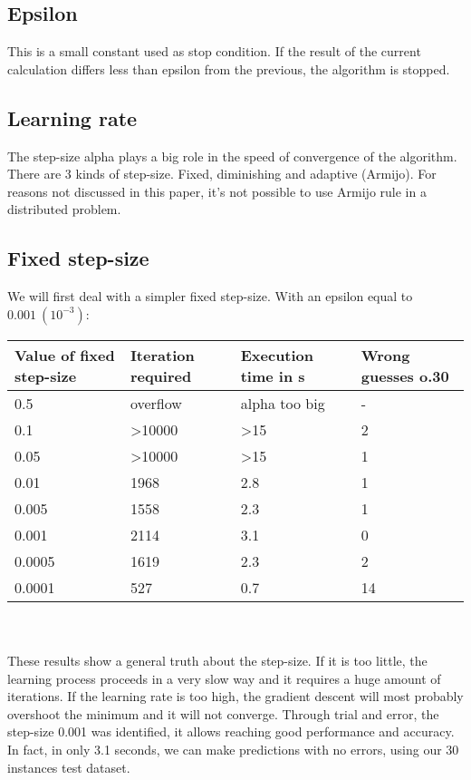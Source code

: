 \documentclass[a4paper,11pt,oneside]{book}
\begin{document}
\subsection{Epsilon} \label{Subsec2.2.2}
This is a small constant used as stop condition. If the result of the current calculation differs less than epsilon from the previous, the algorithm is stopped.

\subsection{Learning rate} \label{Subsec2.2.3}
The step-size alpha plays a big role in the speed of convergence of the algorithm. There are 3 kinds of step-size. Fixed, diminishing and adaptive (Armijo). For reasons not discussed in this paper, it's not possible to use Armijo rule in a distributed problem.

\subsection{Fixed step-size} \label{Subsec2.2.4}
 We will first deal with a simpler fixed step-size. With an epsilon equal to $0.001\  (10^{-3})$:\\
\begin{tabularx}{\textwidth}{|X|X|X|X|}
\hline
\textbf{Value of fixed step-size} & \textbf{Iteration required} & \textbf{Execution time in s} & \textbf{Wrong guesses o.30}\\
\hline
0.5 & overflow & alpha too big & -\\
\hline
0.1 & \textgreater 10000 & \textgreater 15 & 2\\
\hline
0.05 & \textgreater 10000 & \textgreater 15 & 1\\
\hline
0.01 & 1968 & 2.8 & 1\\
\hline
0.005 & 1558 & 2.3 & 1\\
\hline
0.001 & 2114 & 3.1 & 0\\
\hline
0.0005 & 1619 & 2.3 & 2\\
\hline
0.0001 & 527 & 0.7 & 14\\
\hline
\end{tabularx}

\\ \\
These results show a general truth about the step-size. If it is too little, the learning process proceeds in a very slow way and it requires a huge amount of iterations. If the learning rate is too high, the gradient descent will most probably overshoot the minimum and it will not converge. Through trial and error, the step-size 0.001 was identified, it allows reaching good performance and accuracy. In fact, in only 3.1 seconds, we can make predictions with no errors, using our 30 instances test dataset.
\end{document}
